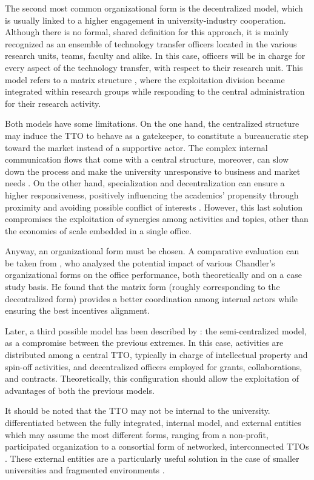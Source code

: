The second most common organizational form is the decentralized model, which is usually linked to a higher engagement in university-industry cooperation. Although there is no formal, shared definition for this approach, it is mainly recognized as an ensemble of technology transfer officers located in the various research units, teams, faculty and alike. In this case, officers will be in charge for every aspect of the technology transfer, with respect to their research unit. This model refers to a matrix structure \citep{Debackere2005}, where the exploitation division became integrated within research groups while responding to the central administration for their research activity.

Both models have some limitations. On the one hand, the centralized structure may induce the TTO to behave as a gatekeeper, to constitute a bureaucratic step toward the market instead of a supportive actor. The complex internal communication flows that come with a central structure, moreover, can slow down the process and make the university unresponsive to business and market needs \citep{Litan2008}. On the other hand, specialization and decentralization can ensure a higher responsiveness, positively influencing the academics' propensity through proximity and avoiding possible conflict of interests \citep{Debackere2005}. However, this last solution compromises the exploitation of synergies among activities and topics, other than the economies of scale embedded in a single office.

Anyway, an organizational form must be chosen. A comparative evaluation can be taken from \citet{Bercovitz2001}, who analyzed the potential impact of various Chandler's organizational forms on the office performance, both theoretically and on a case study basis. He found that the matrix form (roughly corresponding to the decentralized form) provides a better coordination among internal actors while ensuring the best incentives alignment. 

Later, a third possible model has been described by \citet{Brescia2016}: the semi-centralized model, as a compromise between the previous extremes. In this case, activities are distributed among a central TTO, typically in charge of intellectual property and spin-off activities, and decentralized officers employed for grants, collaborations, and contracts. Theoretically, this configuration should allow the exploitation of advantages of both the previous models. 

It should be noted that the TTO may not be internal to the university. \citet{Fisher2002} differentiated between the fully integrated, internal model, and external entities which may assume the most different forms, ranging from a non-profit, participated organization to a consortial form of networked, interconnected TTOs \citep{Brescia2016}. These external entities are a particularly useful solution in the case of smaller universities and fragmented environments \citep{Debackere2005}.

